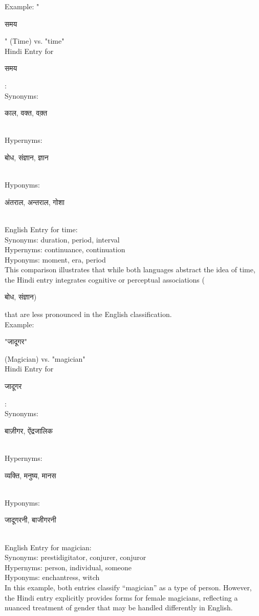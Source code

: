 \documentclass{article}
\begin{document}
Example: "\begin{hindi}समय\end{hindi}" (Time) vs. "time"\\
Hindi Entry for \begin{hindi}समय\end{hindi}:\\
Synonyms: \begin{hindi}काल, वक्त, वक़्त\end{hindi}\\
Hypernyms: \begin{hindi}बोध, संज्ञान, ज्ञान\end{hindi}\\
Hyponyms: \begin{hindi}अंतराल, अन्तराल, गोशा\end{hindi}\\
English Entry for time:\\
Synonyms: duration, period, interval\\
Hypernyms: continuance, continuation\\
Hyponyms: moment, era, period\\
This comparison illustrates that while both languages abstract the idea of time, the Hindi entry integrates cognitive or perceptual associations (\begin{hindi}बोध, संज्ञान)\end{hindi} that are less pronounced in the English classification.\\

Example: \begin{hindi}"जादूगर"\end{hindi} (Magician) vs. "magician"\\
Hindi Entry for \begin{hindi}जादूगर\end{hindi}:\\
Synonyms: \begin{hindi}बाज़ीगर, ऐंद्रजालिक\end{hindi}\\
Hypernyms: \begin{hindi}व्यक्ति, मनुष्य, मानस\end{hindi}\\
Hyponyms: \begin{hindi}जादूगरनी, बाजीगरनी\end{hindi}\\
English Entry for magician:\\
Synonyms: prestidigitator, conjurer, conjuror\\
Hypernyms: person, individual, someone\\
Hyponyms: enchantress, witch\\
In this example, both entries classify “magician” as a type of person. However, the Hindi entry explicitly provides forms for female magicians, reflecting a nuanced treatment of gender that may be handled differently in English.
\end{document}
